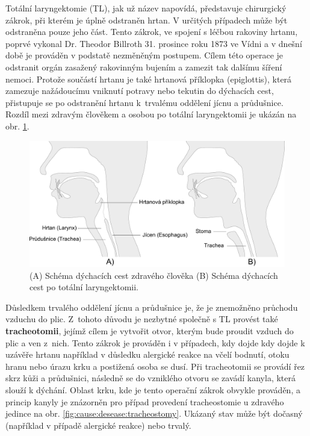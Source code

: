 Totální laryngektomie (TL), jak už název napovídá, představuje chirurgický
zákrok, při kterém je úplně odstraněn hrtan. V určitých případech může být
odstraněna pouze jeho část. Tento zákrok, ve spojení s léčbou
rakoviny hrtanu, poprvé vykonal Dr. Theodor Billroth 31. prosince roku 1873 ve
Vídni \cite{Gussenbauer1874} a v dnešní době je prováděn v podstatě nezměněným postupem.
Cílem této operace je odstranit orgán zasažený rakovinným bujením a
zamezit tak dalšímu šíření nemoci. Protože součástí hrtanu je také hrtanová příklopka
(epiglottis), která zamezuje nažádoucímu vniknutí potravy nebo tekutin do
dýchacích cest, přistupuje se po odstranění hrtanu k~trvalému oddělení jícnu a průdušnice.
Rozdíl mezi zdravým člověkem a osobou po totální laryngektomii je ukázán na
obr. \ref{fig:cause:desease:laryngectomy}.

\begin{figure}[htb]
  \begin{center}
    \def\svgwidth{0.9\linewidth}
    \includegraphics[width=0.9\linewidth]{ch3-cause/figures/dychaci-cesty-tl}
    \caption[Schéma dýchacích cest zdravého člověka a pacienta po TL.]{(A) Schéma dýchacích cest zdravého člověka (B) Schéma dýchacích cest po totální laryngektomii.}
    \label{fig:cause:desease:laryngectomy}
  \end{center}
\end{figure}

Důsledkem trvalého oddělení jícnu a průdušnice je, že je znemožněno průchodu vzduchu do plic.
Z~tohoto důvodu je nezbytné společně s TL provést také \textbf{tracheotomii}, jejímž cílem je vytvořit otvor, kterým
bude proudit vzduch do plic a ven z~nich. Tento zákrok je prováděn i v případech, kdy dojde kdy dojde k uzávěře hrtanu například v důsledku alergické reakce na včelí bodnutí, otoku hranu nebo úrazu krku a postižená osoba se dusí. Při tracheotomii se provádí řez skrz kůži a průdušnici, následně se do vzniklého
otvoru se zavádí kanyla, která slouží k dýchání. Oblast krku, kde je tento operační zákrok obvykle prováděn, a
princip kanyly je znázorněn pro případ provedení tracheostomie u zdravého jedince na obr. \ref{fig:cause:desease:tracheostomy}. Ukázaný stav může být dočasný (například v případě alergické
reakce) nebo trvalý.

